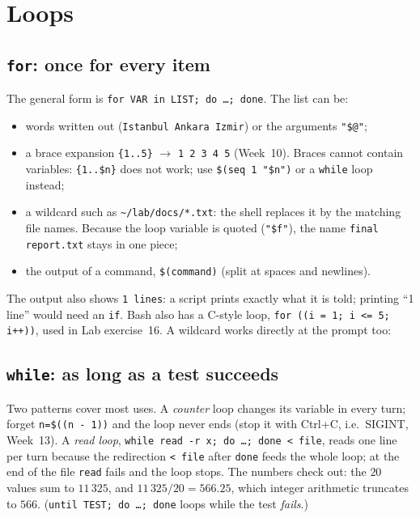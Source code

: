 \documentclass[11pt,a4paper]{article}
\begin{document}
\section{Loops}

\subsection{\texttt{for}: once for every item}




The general form is \texttt{for VAR in LIST; do \ldots; done}. The list can be:
\begin{itemize}
  \item words written out (\texttt{Istanbul Ankara Izmir}) or the arguments \texttt{"\$@"};
  \item a brace expansion \texttt{\{1..5\}} $\to$ \texttt{1 2 3 4 5} (Week~10). Braces cannot contain variables: \texttt{\{1..\$n\}} does not work; use \texttt{\$(seq 1 "\$n")} or a \texttt{while} loop instead;
  \item a wildcard such as \texttt{\textasciitilde/lab/docs/*.txt}: the shell replaces it by the matching file names. Because the loop variable is quoted (\texttt{"\$f"}), the name \texttt{final report.txt} stays in one piece;
  \item the output of a command, \texttt{\$(command)} (split at spaces and newlines).
\end{itemize}
The output also shows \texttt{1 lines}: a script prints exactly what it is told; printing “1 line” would need an \texttt{if}. Bash also has a C-style loop, \texttt{for ((i = 1; i <= 5; i++))}, used in Lab exercise~16. A wildcard works directly at the prompt too:


\subsection{\texttt{while}: as long as a test succeeds}




Two patterns cover most uses. A \emph{counter} loop changes its variable in every turn; forget \texttt{n=\$((n - 1))} and the loop never ends (stop it with Ctrl+C, i.e.\ SIGINT, Week~13). A \emph{read loop}, \texttt{while read -r x; do \ldots; done < file}, reads one line per turn because the redirection \texttt{< file} after \texttt{done} feeds the whole loop; at the end of the file \texttt{read} fails and the loop stops. The numbers check out: the $20$ values sum to $11\,325$, and $11\,325 / 20 = 566.25$, which integer arithmetic truncates to $566$. (\texttt{until TEST; do \ldots; done} loops while the test \emph{fails}.)
\end{document}
